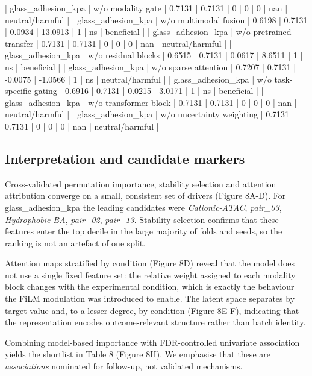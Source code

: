 \documentclass[utf8]{FrontiersinHarvard}
\begin{document}
| glass_adhesion_kpa | w/o modality gate            |       0.7131 |    0.7131 |         0      |             0      |          0 | nan    | neutral/harmful |
| glass_adhesion_kpa | w/o multimodal fusion        |       0.6198 |    0.7131 |         0.0934 |            13.0913 |          1 | ns     | beneficial      |
| glass_adhesion_kpa | w/o pretrained transfer      |       0.7131 |    0.7131 |         0      |             0      |          0 | nan    | neutral/harmful |
| glass_adhesion_kpa | w/o residual blocks          |       0.6515 |    0.7131 |         0.0617 |             8.6511 |          1 | ns     | beneficial      |
| glass_adhesion_kpa | w/o sparse attention         |       0.7207 |    0.7131 |        -0.0075 |            -1.0566 |          1 | ns     | neutral/harmful |
| glass_adhesion_kpa | w/o task-specific gating     |       0.6916 |    0.7131 |         0.0215 |             3.0171 |          1 | ns     | beneficial      |
| glass_adhesion_kpa | w/o transformer block        |       0.7131 |    0.7131 |         0      |             0      |          0 | nan    | neutral/harmful |
| glass_adhesion_kpa | w/o uncertainty weighting    |       0.7131 |    0.7131 |         0      |             0      |          0 | nan    | neutral/harmful |


\subsection{Interpretation and candidate markers}

Cross-validated permutation importance, stability selection and attention attribution converge on a small, consistent set of drivers (Figure 8A-D). For glass_adhesion_kpa the leading candidates were \textit{Cationic-ATAC}, \textit{pair_03}, \textit{Hydrophobic-BA}, \textit{pair_02}, \textit{pair_13}. Stability selection confirms that these features enter the top decile in the large majority of folds and seeds, so the ranking is not an artefact of one split.

Attention maps stratified by condition (Figure 8D) reveal that the model does not use a single fixed feature set: the relative weight assigned to each modality block changes with the experimental condition, which is exactly the behaviour the FiLM modulation was introduced to enable. The latent space separates by target value and, to a lesser degree, by condition (Figure 8E-F), indicating that the representation encodes outcome-relevant structure rather than batch identity.

Combining model-based importance with FDR-controlled univariate association yields the shortlist in Table 8 (Figure 8H). We emphasise that these are \textit{associations} nominated for follow-up, not validated mechanisms.
\end{document}
